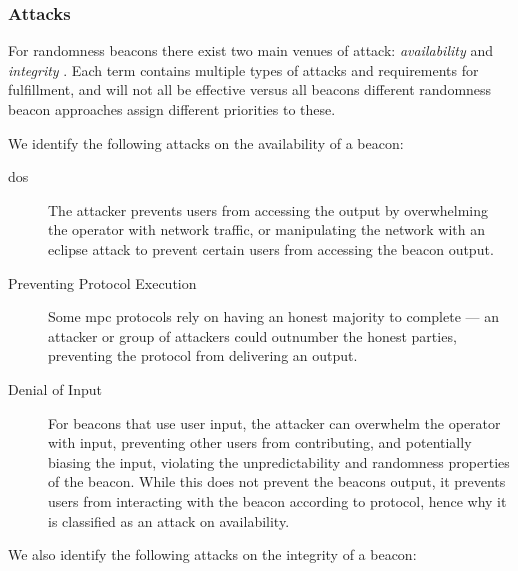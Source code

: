 \subsubsection{Attacks}\label{ssub:security_objectives}
For randomness beacons there exist two main venues of attack: \emph{availability} and \emph{integrity}
.
Each term contains multiple types of attacks and requirements for fulfillment, and will not all be effective versus all beacons different randomness beacon approaches assign different priorities to these.

We identify the following attacks on the availability of a beacon:

\begin{description}
    \item[\Acrfull{dos}] The attacker prevents users from accessing the output by overwhelming the operator with network traffic, or manipulating the network with an eclipse attack to prevent certain users from accessing the beacon output.
    \item[Preventing Protocol Execution] Some \gls{mpc} protocols rely on having an honest majority to complete --- an attacker or group of attackers could outnumber the honest parties, preventing the protocol from delivering an output.
    \item[Denial of Input] For beacons that use user input, the attacker can overwhelm the operator with input, preventing other users from contributing, and potentially biasing the input, violating the unpredictability and randomness properties of the beacon. While this does not prevent the beacons output, it prevents users from interacting with the beacon according to protocol, hence why it is classified as an attack on availability.
\end{description}

\noindent%
We also identify the following attacks on the integrity of a beacon:

